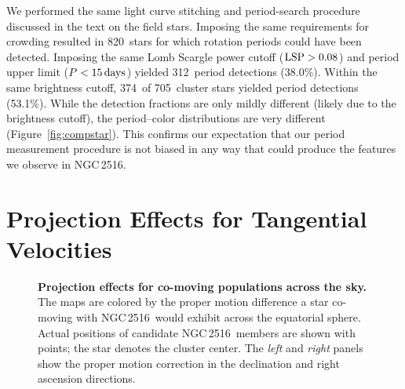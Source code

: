 \documentclass[12pt,twocolumn,tighten]{aastex63}
\newcommand{\cn}{NGC\,2516} %
\newcommand{\ncompstardenominator}{820} %
\newcommand{\ncompstarnumerator}{312} %
\newcommand{\ncompfrac}{38.0\%} %
\newcommand{\nautovscompstardenominator}{705} %
\newcommand{\nautovscompstarnumerator}{374} %
\newcommand{\nautofrac}{53.1\%} %
\begin{document}
We performed the same light curve stitching and period-search
procedure discussed in the text on the field stars.
Imposing the same requirements for crowding resulted in
\ncompstardenominator\ stars for which rotation periods could have
been detected.  Imposing the same Lomb Scargle power cutoff (${\rm
LSP}>0.08$) and period upper limit ($P<15\,{\rm days}$) yielded
\ncompstarnumerator\ period detections (\ncompfrac).  Within the same
brightness cutoff, \nautovscompstarnumerator\ of
\nautovscompstardenominator\ cluster stars yielded period detections
(\nautofrac).  While the detection fractions are only mildly
different (likely due to the brightness cutoff), the period--color
distributions are very different
(Figure~\ref{fig:compstar}).
This confirms our expectation that our period measurement procedure is
not biased in any way that could produce the features we observe in
\cn.


\section{Projection Effects for Tangential Velocities}
\label{app:vproj}

\begin{figure}[t]
	\begin{center}
		\leavevmode
	\end{center}
	\vspace{-0.5cm}
  \caption{ {\bf Projection effects for co-moving populations across
  the sky.} The maps are colored by the proper motion difference a star
  co-moving with \cn\ would exhibit across the equatorial sphere.
  Actual positions of candidate \cn\ members are shown with points;
  the star denotes the cluster center.
  The {\it left} and {\it right} panels show the proper motion correction in
  the declination and right ascension directions.
	\label{fig:vproj}
	}
\end{figure}
\end{document}
